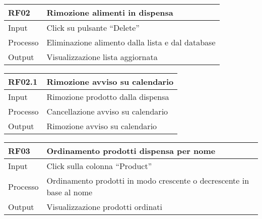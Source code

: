 \begin{table}[H]
    \begin{flushleft}
      \begin{tabular}{l|l}
        \toprule
        \textbf{RF02} & \textbf{Rimozione alimenti in dispensa}\\
        \midrule
        Input & Click su pulsante “Delete”\\
        Processo & Eliminazione alimento dalla lista e dal database\\
        Output & Visualizzazione lista aggiornata\\
        \bottomrule
      \end{tabular}
    \end{flushleft}
\end{table}

\begin{table}[H]
    \begin{flushleft}
      \begin{tabular}{l|l}
        \toprule
        \textbf{RF02.1} & \textbf{Rimozione avviso su calendario}\\
        \midrule
        Input & Rimozione prodotto dalla dispensa\\
        Processo & Cancellazione avviso su calendario\\
        Output & Rimozione avviso su calendario\\
        \bottomrule
      \end{tabular}
    \end{flushleft}
\end{table}

\begin{table}[H]
    \begin{flushleft}
      \begin{tabular}{l|l}
        \toprule
        \textbf{RF03} & \textbf{Ordinamento prodotti dispensa per nome}\\
        \midrule
        Input & Click sulla colonna “Product”\\
        Processo & Ordinamento prodotti in modo crescente o decrescente in base al nome\\
        Output & Visualizzazione prodotti ordinati\\
        \bottomrule
      \end{tabular}
    \end{flushleft}
\end{table}

